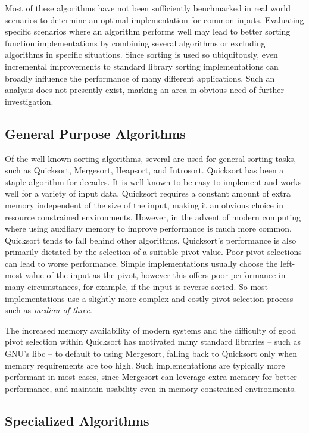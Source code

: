 \documentclass[12pt, conference]{ieeeconf}
\begin{document}
Most of these algorithms have not been sufficiently benchmarked in real world
scenarios to determine an optimal implementation for common inputs. Evaluating
specific scenarios where an algorithm performs well may lead to better sorting
function implementations by combining several algorithms or excluding algorithms
in specific situations. Since sorting is used so ubiquitously, even incremental
improvements to standard library sorting implementations can broadly influence
the performance of many different applications. Such an analysis does not
presently exist, marking an area in obvious need of further investigation.

\subsection{General Purpose Algorithms}

Of the well known sorting algorithms, several are used for general sorting
tasks, such as Quicksort, Mergesort, Heapsort, and Introsort. Quicksort has been
a staple algorithm for decades. It is well known to be easy to implement and
works well for a variety of input data. Quicksort requires a constant amount of
extra memory independent of the size of the input, making it an obvious choice
in resource constrained environments. However, in the advent of modern computing
where using auxiliary memory to improve performance is much more common,
Quicksort tends to fall behind other algorithms. Quicksort's performance is also
primarily dictated by the selection of a suitable pivot value. Poor pivot
selections can lead to worse performance. Simple implementations usually choose
the left-most value of the input as the pivot, however this offers poor
performance in many circumstances, for example, if the input is reverse sorted.
So most implementations use a slightly more complex and costly pivot selection
process such as \textit{median-of-three}\parencite{Bentley1993EngineeringAS}.

The increased memory availability of modern systems and the difficulty of good
pivot selection within Quicksort has motivated many standard libraries -- such
as GNU's libc -- to default to using Mergesort, falling back to Quicksort only
when memory requirements are too high\parencite{glibc}. Such implementations are
typically more performant in most cases, since Mergesort can leverage extra
memory for better performance, and maintain usability even in memory constrained
environments.

\subsection{Specialized Algorithms}
\end{document}
